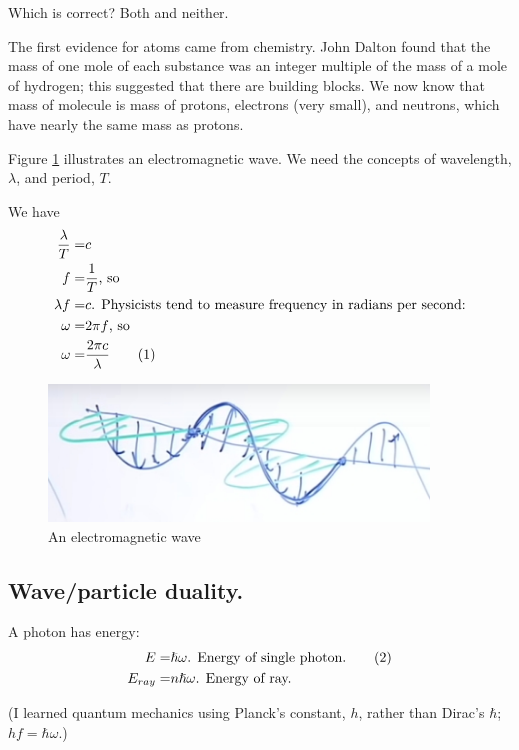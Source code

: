 \documentclass[]{article}
\newcommand\numberthis{\addtocounter{equation}{1}\tag{\theequation}}
\begin{document}
Which is correct? Both and neither.

The first evidence for atoms came from chemistry. John Dalton found that the mass of one mole of each substance was an integer multiple of the mass of a mole of hydrogen; this suggested that there are building blocks. We now know that mass of molecule is mass of protons, electrons (very small), and neutrons, which have nearly the same mass as protons. 
 
Figure \ref{fig:em:wave} illustrates an electromagnetic wave. We need the concepts of wavelength, $\lambda$, and period, $T$.

We have
\begin{align*}
\frac{\lambda}{T}=&c\\
f=&\frac{1}{T} \text{, so}\\
\lambda f =& c\text{. Physicists tend to measure frequency in radians per second:}\\
\omega =& 2 \pi f \text{, so} \\
\omega =& \frac{2 \pi c}{\lambda} \numberthis \label{eq:omega:lambda}
\end{align*}

\begin{figure}[H]
	\caption{An electromagnetic wave}\label{fig:em:wave}  
	\includegraphics[width=0.9\textwidth]{Wavelength}
\end{figure}

\subsection{Wave/particle duality.}

A photon has energy:
\begin{align*}
E=&\hslash \omega \text{. Energy of single photon.} \numberthis\label{eq:E_omega}\\
E_{ray}=&n \hslash \omega \text{. Energy of ray.}
\end{align*}

(I learned quantum mechanics using Planck's constant, $h$, rather than Dirac's $\hbar$; $hf=\hbar\omega$.) 
\end{document}
